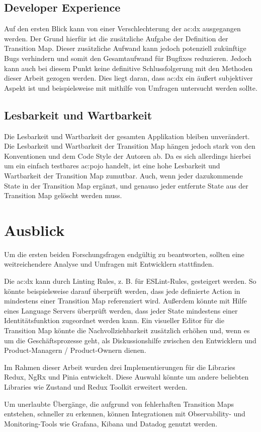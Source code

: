 \subsection{Developer Experience}

Auf den ersten Blick kann von einer Verschlechterung der \acrshort{ac:dx} ausgegangen werden. Der Grund hierfür ist die zusätzliche Aufgabe der Definition der Transition Map. Dieser zusätzliche Aufwand kann jedoch potenziell zukünftige Bugs verhindern und somit den Gesamtaufwand für Bugfixes reduzieren. Jedoch kann auch bei diesem Punkt keine definitive Schlussfolgerung mit den Methoden dieser Arbeit gezogen werden. Dies liegt daran, dass \acrlong{ac:dx} ein äußert subjektiver Aspekt ist und beispielsweise mit mithilfe von Umfragen untersucht werden sollte.

\subsection{Lesbarkeit und Wartbarkeit}

Die Lesbarkeit und Wartbarkeit der gesamten Applikation bleiben unverändert. Die Lesbarkeit und Wartbarkeit der Transition Map hängen jedoch stark von den Konventionen
und dem Code Style der Autoren ab. Da es sich allerdings hierbei um ein einfach testbares \acrshort{ac:pojo} handelt, ist eine hohe Lesbarkeit und Wartbarkeit der Transition Map zumutbar. Auch, wenn jeder dazukommende State in der Transition Map ergänzt, und genauso jeder entfernte State aus der Transition Map gelöscht werden muss.

\section{Ausblick}

Um die ersten beiden Forschungsfragen endgültig zu beantworten, sollten eine weitreichendere Analyse und Umfragen mit Entwicklern stattfinden.

Die \acrshort{ac:dx} kann durch Linting Rules, z. B. für ESLint-Rules, gesteigert werden. So könnte beispielsweise darauf überprüft werden, dass jede definierte Action in mindestens einer Transition Map referenziert wird. Außerdem könnte mit Hilfe eines Language Servers überprüft werden, dass jeder State mindestens einer Identitätsfunktion zugeordnet werden kann. Ein visueller Editor für die Transition Map könnte die Nachvollziehbarkeit zusätzlich erhöhen und, wenn es um die Geschäftsprozesse geht, als Diskussionshilfe zwischen den Entwicklern und Product-Managern / Product-Ownern dienen.

Im Rahmen dieser Arbeit wurden drei Implementierungen für die Libraries Redux, NgRx und Pinia entwickelt. Diese Auswahl könnte um andere beliebten Libraries wie Zustand und Redux Toolkit erweitert werden.

Um unerlaubte Übergänge, die aufgrund von fehlerhaften Transition Maps entstehen, schneller zu erkennen, können Integrationen mit Observability- und Monitoring-Tools wie Grafana, Kibana und Datadog genutzt werden.
